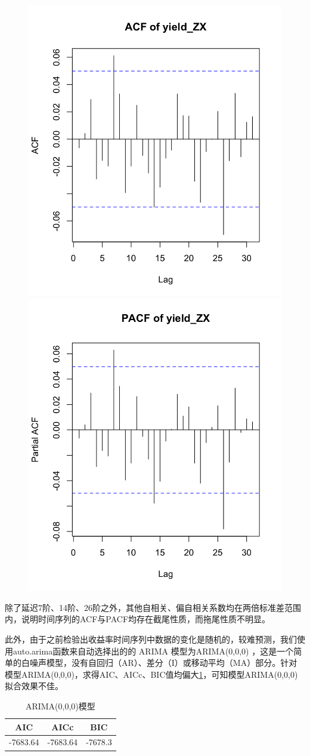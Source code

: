 \documentclass[12pt]{article}
\begin{document}
\begin{figure}[H]
\centering
\subcaptionbox{\label{}}
{\includegraphics[width=.4\textwidth]{A2.png}}
\subcaptionbox{\label{}}
{\includegraphics[width=.4\textwidth]{A3.png}}
\caption{}\label{fig:A23}
\end{figure}


除了延迟7阶、14阶、26阶之外，其他自相关、偏自相关系数均在两倍标准差范围内，说明时间序列的ACF与PACF均存在截尾性质，而拖尾性质不明显。

此外，由于之前检验出收益率时间序列中数据的变化是随机的，较难预测，我们使用auto.arima函数来自动选择出的的 ARIMA 模型为ARIMA(0,0,0) ，这是一个简单的白噪声模型，没有自回归（AR）、差分（I）或移动平均（MA）部分。针对模型ARIMA(0,0,0)，求得AIC、AICc、BIC值均偏大\ref{tab:ARIMA}，可知模型ARIMA(0,0,0)拟合效果不佳。

\begin{table}[H]
    \centering
    \caption{ARIMA(0,0,0)模型}
    \label{tab:ARIMA}
    \begin{tabular}{ccc}
        \toprule
        AIC & AICc & BIC \\ 
        \midrule
        -7683.64 & -7683.64 & -7678.3\\
        \bottomrule
    \end{tabular}
\end{table}
\end{document}
